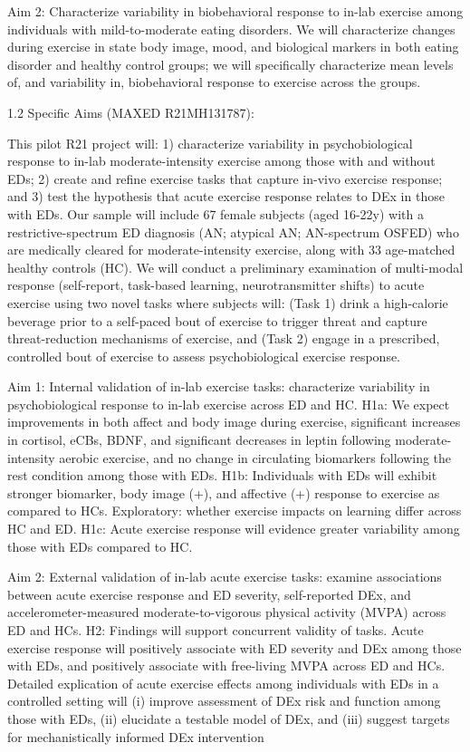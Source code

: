 \documentclass[
]{book}
\begin{document}
Aim 2: Characterize variability in biobehavioral response to in-lab exercise among individuals with mild-to-moderate eating disorders.
We will characterize changes during exercise in state body image, mood, and biological markers in both eating disorder and healthy control groups; we will specifically characterize mean levels of, and variability in, biobehavioral response to exercise across the groups.

1.2 Specific Aims (MAXED R21MH131787):

This pilot R21 project will: 1) characterize variability in psychobiological response to in-lab moderate-intensity exercise among those with and without EDs; 2) create and refine exercise tasks that capture in-vivo exercise response; and 3) test the hypothesis that acute exercise response relates to DEx in those with EDs.
Our sample will include 67 female subjects (aged 16-22y) with a restrictive-spectrum ED diagnosis (AN; atypical AN; AN-spectrum OSFED) who are medically cleared for moderate-intensity exercise, along with 33 age-matched healthy controls (HC).
We will conduct a preliminary examination of multi-modal response (self-report, task-based learning, neurotransmitter shifts) to acute exercise using two novel tasks where subjects will: (Task 1) drink a high-calorie beverage prior to a self-paced bout of exercise to trigger threat and capture threat-reduction mechanisms of exercise, and (Task 2) engage in a prescribed, controlled bout of exercise to assess psychobiological exercise response.

Aim 1: Internal validation of in-lab exercise tasks: characterize variability in psychobiological response to in-lab exercise across ED and HC.
H1a: We expect improvements in both affect and body image during exercise, significant increases in cortisol, eCBs, BDNF, and significant decreases in leptin following moderate-intensity aerobic exercise, and no change in circulating biomarkers following the rest condition among those with EDs.
H1b: Individuals with EDs will exhibit stronger biomarker, body image (+), and affective (+) response to exercise as compared to HCs.
Exploratory: whether exercise impacts on learning differ across HC and ED.
H1c: Acute exercise response will evidence greater variability among those with EDs compared to HC.

Aim 2: External validation of in-lab acute exercise tasks: examine associations between acute exercise response and ED severity, self-reported DEx, and accelerometer-measured moderate-to-vigorous physical activity (MVPA) across ED and HCs.
H2: Findings will support concurrent validity of tasks.
Acute exercise response will positively associate with ED severity and DEx among those with EDs, and positively associate with free-living MVPA across ED and HCs.
Detailed explication of acute exercise effects among individuals with EDs in a controlled setting will (i) improve assessment of DEx risk and function among those with EDs, (ii) elucidate a testable model of DEx, and (iii) suggest targets for mechanistically informed DEx intervention
\end{document}
